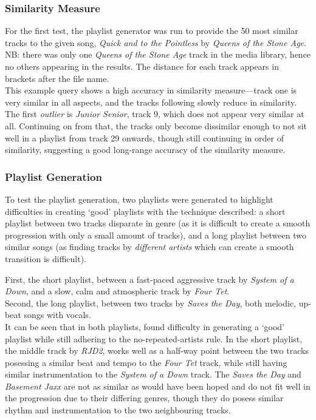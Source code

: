 \subsubsection{Similarity Measure}
For the first test, the playlist generator was run to provide the 50 most similar tracks to the given song, \emph{Quick and to the Pointless} by \emph{Queens of the Stone Age}. NB: there was only one \emph{Queens of the Stone Age} track in the media library, hence no others appearing in the results. The distance for each track appears in brackets after the file name.\\

This example query shows a high accuracy in similarity measure---track one is very similar in all aspects, and the tracks following slowly reduce in similarity. The first \emph{outlier} is \emph{Junior Senior}, track 9, which does not appear very similar at all. Continuing on from that, the tracks only become dissimilar enough to not sit well in a playlist from track 29 onwards, though still continuing in order of similarity, suggesting a good long-range accuracy of the similarity measure. 
\subsubsection{Playlist Generation}
To test the playlist generation, two playlists were generated to highlight difficulties in creating `good' playlists with the technique described: a short playlist between two tracks disparate in genre (as it is difficult to create a smooth progression with only a small amount of tracks), and a long playlist between two similar songs (as finding tracks by \emph{different artists} which can create a smooth transition is difficult).

First, the short playlist, between a fast-paced aggressive track by \emph{System of a Down}, and a slow, calm and atmospheric track by \emph{Four Tet}.\\

Second, the long playlist, between two tracks by \emph{Saves the Day}, both melodic, up-beat songs with vocals.\\

It can be seen that in both playlists,  found difficulty in generating a `good' playlist while still adhering to the no-repeated-artists rule. In the short playlist, the middle track by \emph{RJD2}, works well as a half-way point between the two tracks posessing a similar beat and tempo to the \emph{Four Tet} track, while still having similar instrumentation to the \emph{System of a Down} track. The \emph{Saves the Day} and \emph{Basement Jaxx} are not as similar as would have been hoped and do not fit well in the progression due to their differing genres, though they do posess similar rhythm and instrumentation to the two neighbouring tracks.

